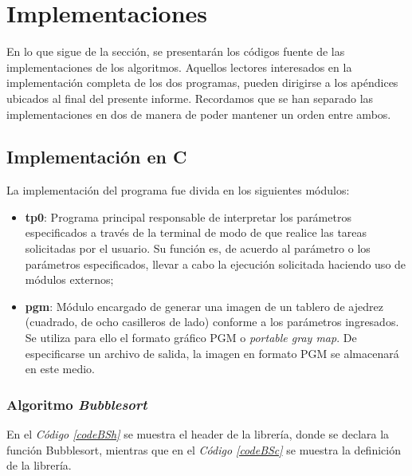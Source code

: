 \documentclass{article}
\newcommand{\refcode}[1]{\textit{Código \ref{#1}}}
\begin{document}
\section{Implementaciones}
	
	En lo que sigue de la sección, se presentarán los códigos fuente de las implementaciones de los algoritmos. Aquellos lectores interesados en la implementación completa de los dos programas, pueden dirigirse a los apéndices ubicados al final del presente informe. Recordamos que se han separado las implementaciones en dos de manera de poder mantener un orden entre ambos.



\subsection{Implementación en C}

	La implementación del programa fue divida en los siguientes módulos:
	\medskip

\begin{itemize}

\itemsep=2pt \topsep=0pt \partopsep=0pt \parskip=0pt \parsep=0pt
	\item \textbf{tp0}: Programa principal responsable de interpretar los parámetros especificados a través de la terminal de modo de que realice las tareas solicitadas por el usuario. Su función es, de acuerdo al parámetro o los parámetros especificados, llevar a cabo la ejecución solicitada haciendo uso de módulos externos;
	\item \textbf{pgm}: Módulo encargado de generar una imagen de un tablero de ajedrez (cuadrado, de ocho casilleros de lado) conforme a los parámetros ingresados. Se utiliza para ello el formato gráfico PGM o \textit{portable gray map}. De especificarse un archivo de salida, la imagen en formato PGM se almacenará en este medio.

\end{itemize}	
\medskip


\subsubsection{Algoritmo \textit{Bubblesort}}

	En el \refcode{codeBSh} se muestra el header de la librería, donde se declara la función Bubblesort, mientras que en el \refcode{codeBSc} se muestra la definición de la librería.

%  
\end{document}

